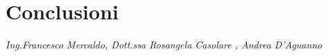
\chapter{Conclusioni}
\label{chap:Conclusioni}

\begin{flushright}
\textit{Ing.Francesco Mercaldo, Dott.ssa Rosangela Casolare , Andrea D'Aguanno} 
\end{flushright}